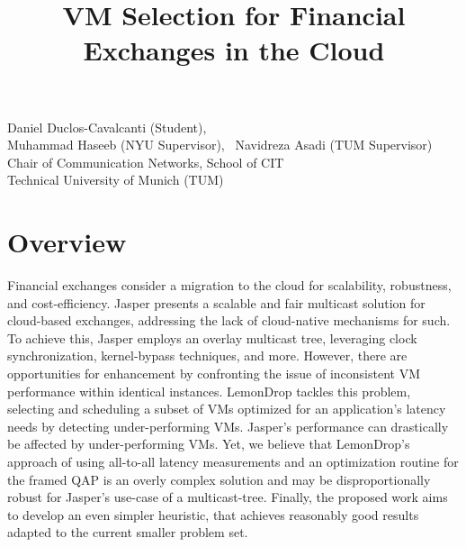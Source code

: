 \documentclass{article}
\title{VM Selection for Financial Exchanges in the Cloud}
\makeatletter
\renewcommand{\maketitle}{%
    \thispagestyle{fancy}%
    \begin{center}
        \Large\bfseries\@title
    \end{center}
    \vspace{-0.25cm}
    \begin{center}
        Daniel Duclos-Cavalcanti (Student),
        \\
        Muhammad Haseeb (NYU Supervisor),
        ~Navidreza Asadi (TUM Supervisor) 
        \\Chair of Communication Networks, School of CIT
        \\Technical University of Munich (TUM)
    \end{center}
}
\makeatother
\begin{document}
\maketitle

\section{Overview}


Financial exchanges consider a migration to the cloud for scalability, robustness, and cost-efficiency.
Jasper \cite{haseeb2024jasper} presents a scalable and fair multicast solution for cloud-based exchanges, 
addressing the lack of cloud-native mechanisms for such. 
To achieve this, Jasper employs an overlay multicast tree, leveraging clock synchronization, kernel-bypass techniques, 
and more.
However, there are opportunities for enhancement by confronting the issue of inconsistent VM performance 
within identical instances. LemonDrop \cite{sachidananda2022scheduling} tackles this problem,
selecting and scheduling a subset of VMs optimized for an application's latency needs by detecting under-performing VMs. 
Jasper's performance can drastically be affected by under-performing VMs.
Yet, we believe that LemonDrop's approach of using all-to-all latency measurements and an optimization routine 
for the framed QAP is an overly complex solution and may be disproportionally robust 
for Jasper's use-case of a multicast-tree. 
Finally, the proposed work aims to develop an even simpler heuristic, that achieves reasonably good results 
adapted to the current smaller problem set.
\end{document}
